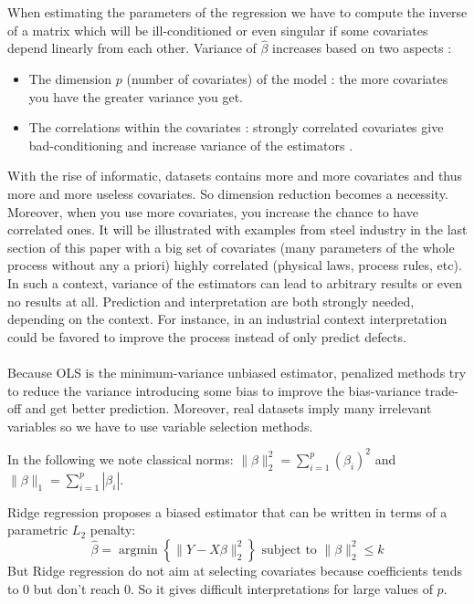\documentclass[11pt,a4paper]{article}
\begin{document}
When estimating the parameters of the regression we have to compute the inverse of a matrix which will be ill-conditioned or even singular if some covariates depend linearly from each other. 
Variance of $\hat{\beta}$ increases based on two aspects :
\begin{itemize}
	\item The dimension $p$ (number of covariates) of the model  : the more covariates you have the greater variance you get.
	\item The correlations within the covariates : strongly correlated covariates give bad-conditioning and increase variance of the estimators .
\end{itemize}

	With the rise of informatic, datasets contains more and more covariates and thus more and more useless covariates. So dimension reduction becomes a necessity. Moreover, when you use more covariates, you increase the chance to have correlated ones.  It will be illustrated with examples from steel industry in the last section of this paper with a big set of covariates (many parameters of the whole process without any a priori) highly correlated (physical laws, process rules, etc). In such a context, variance of the estimators can lead to arbitrary results or even no results at all. Prediction and interpretation are both strongly needed, depending on the context. For instance, in an industrial context interpretation could be favored to improve the process instead of only predict defects.
		~\\	~\\
		
	Because OLS is the minimum-variance unbiased estimator, penalized methods try to reduce the variance introducing some bias to improve the bias-variance trade-off and get better prediction.
Moreover, real datasets imply many irrelevant variables so we have to use variable selection methods.

In the following we note classical norms: $\parallel\beta\parallel_2^2=\sum_{i=1}^p(\beta_i)^2$ and $\parallel\beta \parallel_1=\sum_{i=1}^p|\beta_i| $.

	Ridge regression\cite{marquardt1975ridge} proposes a biased estimator that can be written in terms of a parametric $L_2$ penalty:
	\begin{equation}
		 \hat{\beta}=\operatorname{argmin} \left\lbrace \parallel Y-X\beta\parallel_2^2 \right\rbrace \textrm{ subject to } \parallel\beta\parallel_2^2\leq k
	\end{equation}
	But Ridge regression do not aim at selecting covariates because coefficients tends to 0 but don't reach 0.
	So it gives difficult interpretations for large values of $p$.	
	
\end{document}
